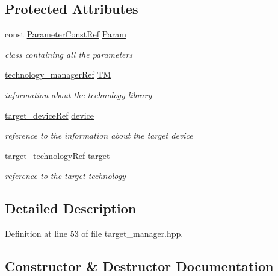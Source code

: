 \subsection*{Protected Attributes}
\begin{DoxyCompactItemize}
\item 
const \hyperlink{Parameter_8hpp_a37841774a6fcb479b597fdf8955eb4ea}{Parameter\+Const\+Ref} \hyperlink{classtarget__manager_adbf98931b360d2f93983a484b5af88db}{Param}
\begin{DoxyCompactList}\small\item\em class containing all the parameters \end{DoxyCompactList}\item 
\hyperlink{technology__manager_8hpp_a4b9ecd440c804109c962654f9227244e}{technology\+\_\+manager\+Ref} \hyperlink{classtarget__manager_a9169f1cec19f8474a03781ca1c80fff0}{TM}
\begin{DoxyCompactList}\small\item\em information about the technology library \end{DoxyCompactList}\item 
\hyperlink{target__device_8hpp_acedb2b7a617e27e6354a8049fee44eda}{target\+\_\+device\+Ref} \hyperlink{classtarget__manager_af678484b7801324da5d10ec140136c7f}{device}
\begin{DoxyCompactList}\small\item\em reference to the information about the target device \end{DoxyCompactList}\item 
\hyperlink{target__technology_8hpp_a16af97aadc4eb998c2c9ec7fba5ccecd}{target\+\_\+technology\+Ref} \hyperlink{classtarget__manager_a87eedb7aab65e0df7b4ca0147a0908dc}{target}
\begin{DoxyCompactList}\small\item\em reference to the target technology \end{DoxyCompactList}\end{DoxyCompactItemize}


\subsection{Detailed Description}


Definition at line 53 of file target\+\_\+manager.\+hpp.



\subsection{Constructor \& Destructor Documentation}
\mbox{\label{classtarget__manager_abdffc4b87550d63ae0e389b69c8de199}} 

